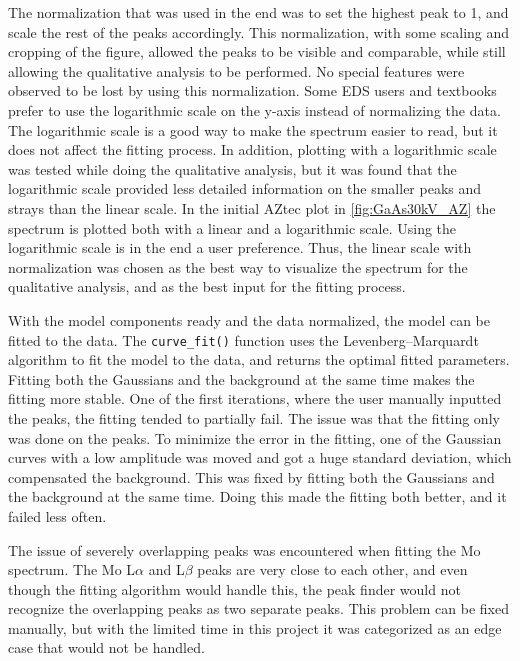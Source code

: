 The normalization that was used in the end was to set the highest peak to 1, and scale the rest of the peaks accordingly.
This normalization, with some scaling and cropping of the figure, allowed the peaks to be visible and comparable, while still allowing the qualitative analysis to be performed.
No special features were observed to be lost by using this normalization.
Some EDS users and textbooks prefer to use the logarithmic scale on the y-axis instead of normalizing the data.
The logarithmic scale is a good way to make the spectrum easier to read, but it does not affect the fitting process.
In addition, plotting with a logarithmic scale was tested while doing the qualitative analysis, but it was found that the logarithmic scale provided less detailed information on the smaller peaks and strays than the linear scale.
In the initial AZtec plot in \cref{fig:GaAs30kV_AZ} the spectrum is plotted both with a linear and a logarithmic scale.
Using the logarithmic scale is in the end a user preference.
Thus, the linear scale with normalization was chosen as the best way to visualize the spectrum for the qualitative analysis, and as the best input for the fitting process.


With the model components ready and the data normalized, the model can be fitted to the data.
The \verb|curve_fit()| function uses the Levenberg–Marquardt algorithm to fit the model to the data, and returns the optimal fitted parameters.
Fitting both the Gaussians and the background at the same time makes the fitting more stable.
One of the first iterations, where the user manually inputted the peaks, the fitting tended to partially fail.
The issue was that the fitting only was done on the peaks.
To minimize the error in the fitting, one of the Gaussian curves with a low amplitude was moved and got a huge standard deviation, which compensated the background.
This was fixed by fitting both the Gaussians and the background at the same time.
Doing this made the fitting both better, and it failed less often.

The issue of severely overlapping peaks was encountered when fitting the Mo spectrum.
The Mo L$\alpha$ and L$\beta$ peaks are very close to each other, and even though the fitting algorithm would handle this, the peak finder would not recognize the overlapping peaks as two separate peaks.
This problem can be fixed manually, but with the limited time in this project it was categorized as an edge case that would not be handled.

